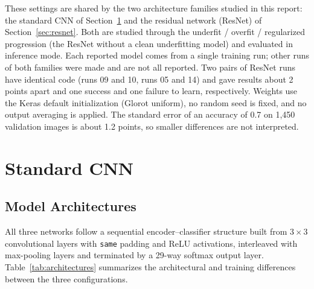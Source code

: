 \documentclass[11pt, a4paper]{article}
\begin{document}
These settings are shared by the two architecture families studied in this report: the standard CNN of Section~\ref{sec:cnn} and the residual network (ResNet) of Section~\ref{sec:resnet}. Both are studied through the underfit / overfit / regularized progression (the ResNet without a clean underfitting model) and evaluated in inference mode. Each reported model comes from a single training run; other runs of both families were made and are not all reported. Two pairs of ResNet runs have identical code (runs 09 and 10, runs 05 and 14) and gave results about 2 points apart and one success and one failure to learn, respectively. Weights use the Keras default initialization (Glorot uniform), no random seed is fixed, and no output averaging is applied. The standard error of an accuracy of 0.7 on 1,450 validation images is about 1.2 points, so smaller differences are not interpreted.

\section{Standard CNN}
\label{sec:cnn}

\subsection{Model Architectures}

All three networks follow a sequential encoder--classifier structure built from $3 \times 3$ convolutional layers with \texttt{same} padding and ReLU activations, interleaved with max-pooling layers and terminated by a 29-way softmax output layer. Table~\ref{tab:architectures} summarizes the architectural and training differences between the three configurations.
\end{document}
